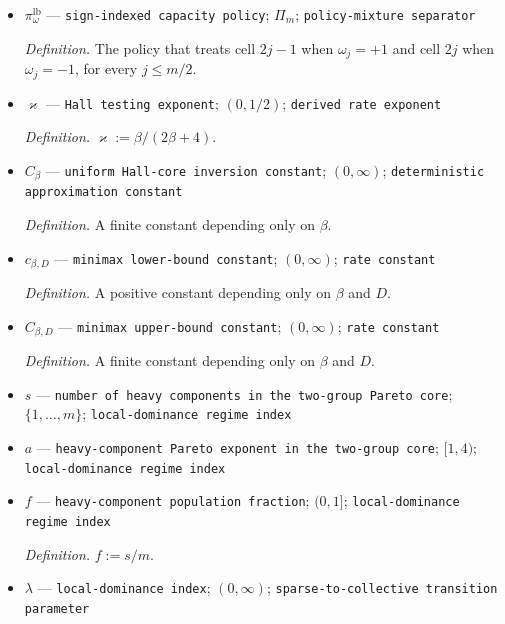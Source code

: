 \documentclass{article}
\begin{document}
\begin{itemize}
  \par\smallskip\noindent\emph{Definition.} \texttt{The law constructed by the paired-\allowbreak{}cell Assouad-\allowbreak{}-\allowbreak{}Fano confidence-\allowbreak{}width handle.}
  \item \(\pi^{\mathrm{lb}}_{\omega}\) --- \texttt{sign-\allowbreak{}indexed capacity policy}; \(\Pi_m\); \texttt{policy-\allowbreak{}mixture separator}
  \par\smallskip\noindent\emph{Definition.} The policy that treats cell \(2j-1\) when \(\omega_j=+1\) and cell \(2j\) when \(\omega_j=-1\), for every \(j\le m/2\).
  \item \(\varkappa\) --- \texttt{Hall testing exponent}; \((0,1/2)\); \texttt{derived rate exponent}
  \par\smallskip\noindent\emph{Definition.} \(\varkappa:=\beta/(2\beta+4)\).
  \item \(C_{\beta}\) --- \texttt{uniform Hall-\allowbreak{}core inversion constant}; \((0,\infty)\); \texttt{deterministic approximation constant}
  \par\smallskip\noindent\emph{Definition.} A finite constant depending only on \(\beta\).
  \item \(c_{\beta,D}\) --- \texttt{minimax lower-\allowbreak{}bound constant}; \((0,\infty)\); \texttt{rate constant}
  \par\smallskip\noindent\emph{Definition.} A positive constant depending only on \(\beta\) and \(D\).
  \item \(C_{\beta,D}\) --- \texttt{minimax upper-\allowbreak{}bound constant}; \((0,\infty)\); \texttt{rate constant}
  \par\smallskip\noindent\emph{Definition.} A finite constant depending only on \(\beta\) and \(D\).
  \item \(s\) --- \texttt{number of heavy components in the two-\allowbreak{}group Pareto core}; \(\{1,\ldots,m\}\); \texttt{local-\allowbreak{}dominance regime index}
  \item \(a\) --- \texttt{heavy-\allowbreak{}component Pareto exponent in the two-\allowbreak{}group core}; \([1,4)\); \texttt{local-\allowbreak{}dominance regime index}
  \item \(f\) --- \texttt{heavy-\allowbreak{}component population fraction}; \((0,1]\); \texttt{local-\allowbreak{}dominance regime index}
  \par\smallskip\noindent\emph{Definition.} \(f:=s/m\).
  \item \(\lambda\) --- \texttt{local-\allowbreak{}dominance index}; \((0,\infty)\); \texttt{sparse-\allowbreak{}to-\allowbreak{}collective transition parameter}

\end{itemize}
\end{document}
